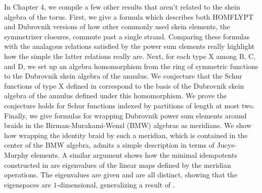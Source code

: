 In Chapter 4, we compile a few other results that aren't related to the skein algebra of the torus. First, we give a formula which describes both HOMFLYPT and Dubrovnik versions of how other commonly used skein elements, the symmetrizer closures, commute past a single strand. Comparing these formulas with the analagous relations satisfied by the power sum elements really highlight how the simple the latter relations really are. Next, for each type X among B, C, and D, we set up an algebra homomorphism from the ring of symmetric functions to the Dubrovnik skein algebra of the annulus. We conjecture that the Schur functions of type X defined in \cite{KT87} correspond to the basis of the Dubrovnik skein algebra of the annulus defined \cite{LZ02} under this homomorphism. We prove the conjecture holds for Schur functions indexed by partitions of length at most two. Finally, we give formulas for wrapping Dubrovnik power sum elements around braids in the Birman-Murakami-Wenzl (BMW) algebras as meridians. We show how wrapping the identity braid by such a meridian, which is contained in the center of the BMW algebra, admits a simple description in terms of Jucys-Murphy elements. A similar argument shows how the minimal idempotents constructed in \cite{BB01} are eigenvalues of the linear maps defined by the meridian operations. The eigenvalues are given and are all distinct, showing that the eigenspaces are $1$-dimensional, generalizing a result of \cite{LZ02}.



















